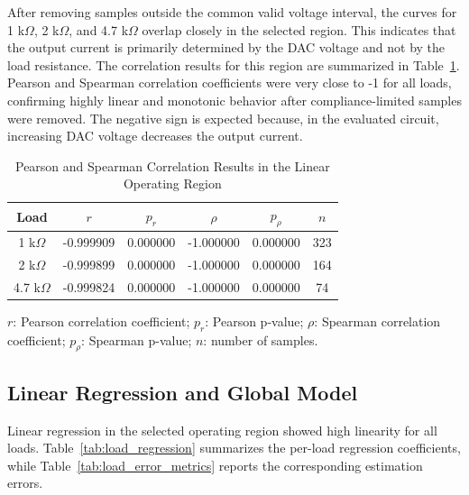 \documentclass[conference]{IEEEtran}
\begin{document}
After removing samples outside the common valid voltage interval, the curves for 1 k$\Omega$, 2 k$\Omega$, and 4.7 k$\Omega$ overlap closely in the selected region. This indicates that the output current is primarily determined by the DAC voltage and not by the load resistance. The correlation results for this region are summarized in Table~\ref{tab:correlation}. Pearson and Spearman correlation coefficients were very close to -1 for all loads, confirming highly linear and monotonic behavior after compliance-limited samples were removed. The negative sign is expected because, in the evaluated circuit, increasing DAC voltage decreases the output current.

\begin{table}[!htbp]
\caption{Pearson and Spearman Correlation Results in the Linear Operating Region}
\begin{center}
\scriptsize
\renewcommand{\arraystretch}{0.92}
\begin{tabular}{|c|c|c|c|c|c|}
\hline
\textbf{Load} & \textbf{$r$} & \textbf{$p_r$} & \textbf{$\rho$} & \textbf{$p_\rho$} & \textbf{$n$} \\
\hline
1 k$\Omega$ & -0.999909 & 0.000000 & -1.000000 & 0.000000 & 323 \\
\hline
2 k$\Omega$ & -0.999899 & 0.000000 & -1.000000 & 0.000000 & 164 \\
\hline
4.7 k$\Omega$ & -0.999824 & 0.000000 & -1.000000 & 0.000000 & 74 \\
\hline
\end{tabular}
\renewcommand{\arraystretch}{1}
\vspace{1mm}

\parbox{\columnwidth}{\scriptsize $r$: Pearson correlation coefficient; $p_r$: Pearson p-value; $\rho$: Spearman correlation coefficient; $p_\rho$: Spearman p-value; $n$: number of samples.}
\label{tab:correlation}
\end{center}
\end{table}

\subsection{Linear Regression and Global Model}

Linear regression in the selected operating region showed high linearity for all loads. Table~\ref{tab:load_regression} summarizes the per-load regression coefficients, while Table~\ref{tab:load_error_metrics} reports the corresponding estimation errors.
\end{document}
